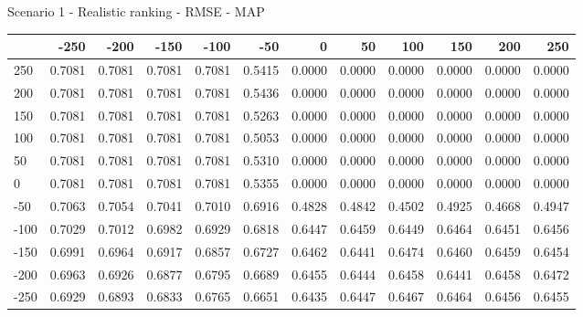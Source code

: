 Scenario 1 - Realistic ranking - RMSE - MAP
\begin{tabular}{lrrrrrrrrrrr}
\toprule
{} &   -250 &   -200 &   -150 &   -100 &   -50  &    0   &    50  &    100 &    150 &    200 &    250 \\
\midrule
 250 & 0.7081 & 0.7081 & 0.7081 & 0.7081 & 0.5415 & 0.0000 & 0.0000 & 0.0000 & 0.0000 & 0.0000 & 0.0000 \\
 200 & 0.7081 & 0.7081 & 0.7081 & 0.7081 & 0.5436 & 0.0000 & 0.0000 & 0.0000 & 0.0000 & 0.0000 & 0.0000 \\
 150 & 0.7081 & 0.7081 & 0.7081 & 0.7081 & 0.5263 & 0.0000 & 0.0000 & 0.0000 & 0.0000 & 0.0000 & 0.0000 \\
 100 & 0.7081 & 0.7081 & 0.7081 & 0.7081 & 0.5053 & 0.0000 & 0.0000 & 0.0000 & 0.0000 & 0.0000 & 0.0000 \\
 50  & 0.7081 & 0.7081 & 0.7081 & 0.7081 & 0.5310 & 0.0000 & 0.0000 & 0.0000 & 0.0000 & 0.0000 & 0.0000 \\
 0   & 0.7081 & 0.7081 & 0.7081 & 0.7081 & 0.5355 & 0.0000 & 0.0000 & 0.0000 & 0.0000 & 0.0000 & 0.0000 \\
-50  & 0.7063 & 0.7054 & 0.7041 & 0.7010 & 0.6916 & 0.4828 & 0.4842 & 0.4502 & 0.4925 & 0.4668 & 0.4947 \\
-100 & 0.7029 & 0.7012 & 0.6982 & 0.6929 & 0.6818 & 0.6447 & 0.6459 & 0.6449 & 0.6464 & 0.6451 & 0.6456 \\
-150 & 0.6991 & 0.6964 & 0.6917 & 0.6857 & 0.6727 & 0.6462 & 0.6441 & 0.6474 & 0.6460 & 0.6459 & 0.6454 \\
-200 & 0.6963 & 0.6926 & 0.6877 & 0.6795 & 0.6689 & 0.6455 & 0.6444 & 0.6458 & 0.6441 & 0.6458 & 0.6472 \\
-250 & 0.6929 & 0.6893 & 0.6833 & 0.6765 & 0.6651 & 0.6435 & 0.6447 & 0.6467 & 0.6464 & 0.6456 & 0.6455 \\
\bottomrule
\end{tabular}

